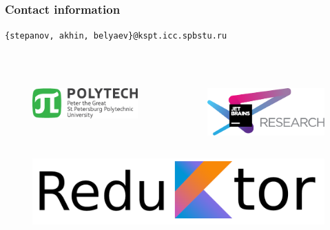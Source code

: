 %
%

\begin{frame}[fragile]
\frametitle{Contact information}
\texttt{\{stepanov, akhin, belyaev\}@kspt.icc.spbstu.ru} \\ \ \\ \ \\
\begin{columns} 
	\begin{figure}
		\includegraphics[width=0.99\linewidth]{image/polytech_logo_en} 
	\end{figure}
	\begin{figure}
		\includegraphics[width=0.99\linewidth]{image/jetbrainsLogo} 
	\end{figure}
\end{columns}
	\begin{figure}
		\includegraphics[width=0.4\linewidth]{image/Reduktor} 
	\end{figure}
\end{frame}
